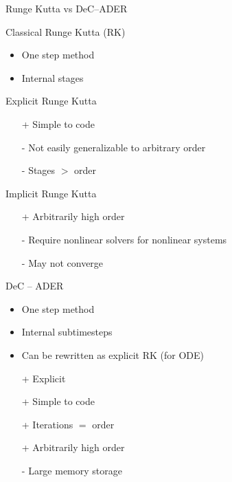 \documentclass[9pt,compress,t,aspectratio=169]{beamer}
\begin{document}
\begin{frame}{Runge Kutta vs DeC--ADER}
	\begin{minipage}{0.54\textwidth}
		\begin{block}{Classical Runge Kutta (RK)}
			\begin{itemize}
				\item One step method\item Internal stages
			\end{itemize}
			Explicit Runge Kutta
			\begin{itemize}
				\item[\color{green}+] Simple to code 
				\item[\color{red}-] Not easily generalizable to arbitrary order
				\item[\color{red}-] Stages $>$ order 
			\end{itemize}
			Implicit Runge Kutta
			\begin{itemize}
				\item[\color{green}+] Arbitrarily high order
				\item[\color{red}-] Require nonlinear solvers for nonlinear systems
				\item[\color{red}-] May not converge
			\end{itemize}
		\end{block}
	\end{minipage}
	\hfill
	\begin{minipage}{0.41\textwidth}
		\begin{block}{DeC -- ADER}
			\begin{itemize}
				\item One step method\item Internal subtimesteps \item Can be rewritten as explicit RK (for ODE)
				\item[\color{green}+] Explicit
				\item[\color{green}+] Simple to code 
				\item[\color{green}+] Iterations $=$ order 
				\item[\color{green}+] Arbitrarily high order
				\item[\color{red}-] Large memory storage
			\end{itemize}
		\end{block}
	\end{minipage}
	
	
\end{frame}
\end{document}
